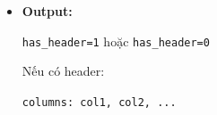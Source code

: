 \begin{itemize}
\begin{itemize}
        \item \textbf{Module 4 (Xác định header):}
        \begin{itemize}
            \item Nếu mọi cell đều \textbf{không phải số} $\rightarrow$ \texttt{has\_header=1}
            \item Ngược lại $\rightarrow$ \texttt{has\_header=0}
        \end{itemize}

        \item \textbf{Module 5 (Ghi output):}
        \begin{itemize}
            \item Hàm \texttt{writeOutput(path, has\_header, columns)}
            \item Nếu có header $\rightarrow$ in thêm danh sách cột
        \end{itemize}
    \end{itemize}

    \item \textbf{Output:}
    \begin{center}
    \texttt{has\_header=1} hoặc \texttt{has\_header=0}
    \end{center}
    Nếu có header:
    \begin{center}
    \texttt{columns: col1, col2, ...}
    \end{center}
\end{itemize}

